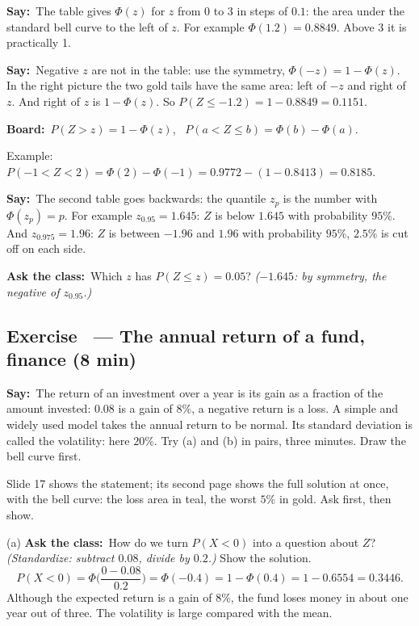 \documentclass[11pt,a4paper,parskip=half]{scrartcl}
\renewcommand{\needspace}[1]{\Needspace{6\baselineskip}}
\newcommand{\say}{\textbf{\color{teal}Say:}\ }
\newcommand{\board}{\textbf{\color{gold}Board:}\ }
\newcommand{\ask}{\textbf{\color{navy}Ask the class:}\ }
\begin{document}
\say The table gives $\Phi(z)$ for $z$ from 0 to 3 in steps of $0.1$:
the area under the standard bell curve to the left of $z$. For example
$\Phi(1.2)=0.8849$. Above 3 it is practically 1.

\say Negative $z$ are not in the table: use the symmetry,
$\Phi(-z)=1-\Phi(z)$. In the right picture the two gold tails have the
same area: left of $-z$ and right of $z$. And right of $z$ is
$1-\Phi(z)$. So $P(Z\le-1.2)=1-0.8849=0.1151$.

\board $P(Z>z)=1-\Phi(z)$, \ $P(a<Z\le b)=\Phi(b)-\Phi(a)$.

Example: $P(-1<Z<2)=\Phi(2)-\Phi(-1)=0.9772-(1-0.8413)=0.8185$.

\say The second table goes backwards: the quantile $z_p$ is the number
with $\Phi(z_p)=p$. For example $z_{0.95}=1.645$: $Z$ is below $1.645$
with probability $95\%$. And $z_{0.975}=1.96$: $Z$ is between $-1.96$ and
$1.96$ with probability $95\%$, $2.5\%$ is cut off on each side.

\ask Which $z$ has $P(Z\le z)=0.05$? \emph{($-1.645$: by symmetry, the
negative of $z_{0.95}$.)}

\needspace{0.25\textheight}
\subsection{Exercise~ --- The annual return of a fund, finance (8 min)}


\say The return of an investment over a year is its gain as a fraction
of the amount invested: $0.08$ is a gain of $8\%$, a negative return is a
loss. A simple and widely used model takes the annual return to be
normal. Its standard deviation is called the volatility: here $20\%$.
Try (a) and (b) in pairs, three minutes. Draw the bell curve first.

\begin{slidecue}
	Slide 17 shows the statement; its second page shows the full solution at
	once, with the bell curve: the loss area in teal, the worst $5\%$ in
	gold. Ask first, then show.
\end{slidecue}

(a) \ask How do we turn $P(X<0)$ into a question about $Z$?
\emph{(Standardize: subtract $0.08$, divide by $0.2$.)} Show the
solution.
\[ P(X<0)=\Phi\Big(\frac{0-0.08}{0.2}\Big)=\Phi(-0.4)=1-\Phi(0.4)
	=1-0.6554=0.3446. \]
Although the expected return is a gain of $8\%$, the fund loses money in
about one year out of three. The volatility is large compared with the
mean.
\end{document}

